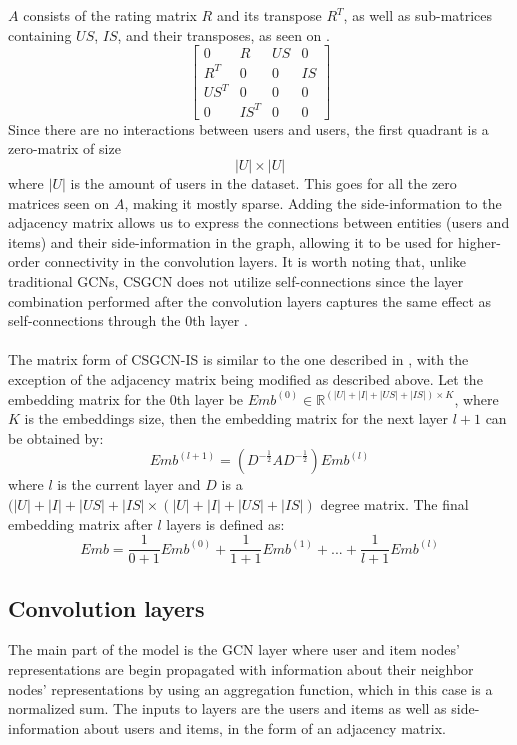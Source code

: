 $A$ consists of the rating matrix $R$ and its transpose $R^T$, as well as sub-matrices containing $US$, $IS$, and their transposes, as seen on .
\begin{equation}\label{csgcn_is_adj_mat}
    \begin{bmatrix}
    0 & R & US & 0\\
    R^T & 0 & 0 & IS\\
    US^T & 0 & 0 & 0 \\
    0 & IS^T & 0 & 0
    \end{bmatrix}
\end{equation}
Since there are no interactions between users and users, the first quadrant is a zero-matrix of size $$|U|\times|U|$$ where $|U|$ is the amount of users in the dataset.
This goes for all the zero matrices seen on $A$, making it mostly sparse.
Adding the side-information to the adjacency matrix allows us to express the connections between entities (users and items) and their side-information in the graph, allowing it to be used for higher-order connectivity in the convolution layers.
It is worth noting that, unlike traditional GCNs, CSGCN does not utilize self-connections since the layer combination performed after the convolution layers captures the same effect as self-connections through the 0th layer \cite{LightGCN}.
\\\\
The matrix form of CSGCN-IS is similar to the one described in \cite{LightGCN}, with the exception of the adjacency matrix being modified as described above.
Let the embedding matrix for the 0th layer be $Emb^{(0)} \in \mathbb{R}^{(|U| + |I| + |US| + |IS|) \times K}$, where $K$ is the embeddings size, then the embedding matrix for the next layer $l+1$ can be obtained by:
\begin{equation}
    Emb^{(l+1)} = (D^{-\frac{1}{2}}AD^{-\frac{1}{2}})Emb^{(l)}
\end{equation}
where $l$ is the current layer and $D$ is a $(|U| + |I| + |US| + |IS| \times (|U| + |I| + |US| + |IS|)$ degree matrix. 
The final embedding matrix after $l$ layers is defined as:
\begin{equation}
    Emb = \frac{1}{0 +1}Emb^{(0)} + \frac{1}{1 +1}Emb^{(1)} + ... + \frac{1}{l +1}Emb^{(l)}
\end{equation}


\subsection{Convolution layers}\label{subsec:csgcn_is_conv_layer}
The main part of the model is the GCN layer where user and item nodes' representations are begin propagated with information about their neighbor nodes' representations by using an aggregation function, which in this case is a normalized sum.
The inputs to layers are the users and items as well as side-information about users and items, in the form of an adjacency matrix.

